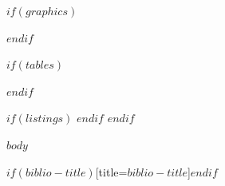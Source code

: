 \documentclass[
	$if(lang)$$babel-lang$,$endif$$if(fontsize)$$fontsize$,$else$12pt,$endif$ %
	$if(lang)$$babel-lang$,$endif$oneside,			%
	pagesize,
	$if(papersize)$paper=$papersize$,$else$paper=a4,$endif$
	parskip=half,		%
	headheight = 18pt,	%
	headsepline,		%
	footsepline,		%
	footheight = 18pt,	%
	abstract=true,		%
	DIV=calc,		%
	BCOR=8mm,		%
	headinclude=false,	%
	footinclude=false,	%
	toc=bibliography,	%
]{scrbook}	%
\begin{document}
	$if(graphics)$
		\cleardoublepage
		\listoffigures
	$endif$

	$if(tables)$
		\cleardoublepage
		\listoftables
	$endif$

	$if(listings)$
		\cleardoublepage
		\lstlistoflistings
	$endif$
	$endif$

	\cleardoublepage

	\pagestyle{headings}
	\chead{\sectionmark \: \rightmark}
	\cfoot*{\thepage}

	$body$ %


		\printbibliography$if(biblio-title)$[title=$biblio-title$]$endif$
\end{document}
